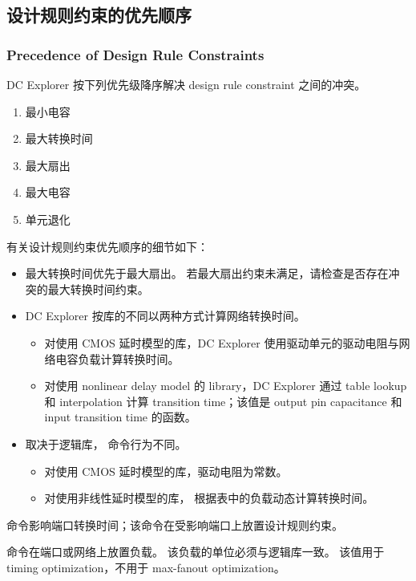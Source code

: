 \subsection{设计规则约束的优先顺序}
\subsubsection*{Precedence of Design Rule Constraints}

DC Explorer 按下列优先级降序解决 design rule constraint 之间的冲突。
\begin{enumerate}
  \item 最小电容
  \item 最大转换时间
  \item 最大扇出
  \item 最大电容
  \item 单元退化
\end{enumerate}

有关设计规则约束优先顺序的细节如下：
\begin{itemize}
  \item 最大转换时间优先于最大扇出。
        若最大扇出约束未满足，请检查是否存在冲突的最大转换时间约束。
  \item DC Explorer 按库的不同以两种方式计算网络转换时间。
  \begin{itemize}
    \item 对使用 CMOS 延时模型的库，DC Explorer 使用驱动单元的驱动电阻与网络电容负载计算转换时间。
    \item 对使用 nonlinear delay model 的 library，DC Explorer 通过 table lookup 和 interpolation 计算 transition time；该值是 output pin capacitance 和 input transition time 的函数。
  \end{itemize}
  \item 取决于逻辑库， 命令行为不同。
  \begin{itemize}
    \item 对使用 CMOS 延时模型的库，驱动电阻为常数。
    \item 对使用非线性延时模型的库， 根据表中的负载动态计算转换时间。
  \end{itemize}
\end{itemize}

 命令影响端口转换时间；该命令在受影响端口上放置设计规则约束。

 命令在端口或网络上放置负载。
该负载的单位必须与逻辑库一致。
该值用于 timing optimization，不用于 max-fanout optimization。


